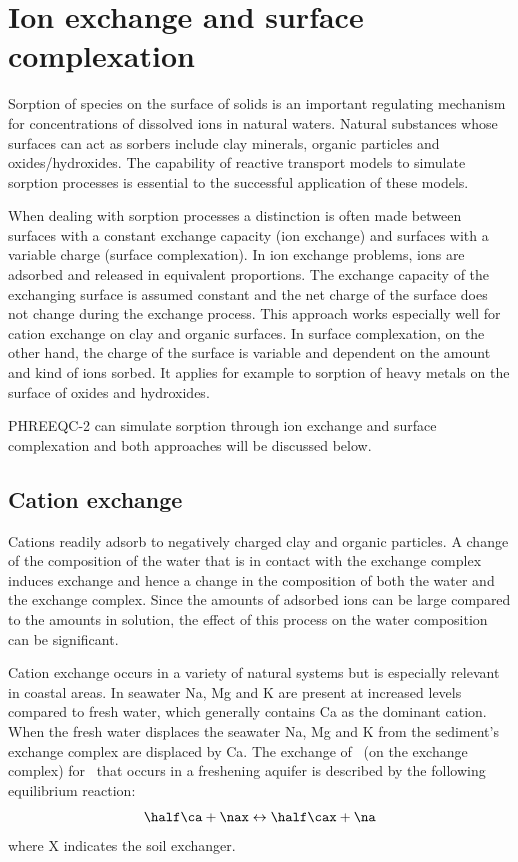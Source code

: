 \chapter{Ion exchange and surface complexation}
\def\shorttitle{Ion exchange and surface complexation} %

Sorption of species on the surface of solids is an important regulating mechanism for concentrations of dissolved ions in natural waters. Natural substances whose surfaces can act as sorbers include clay minerals, organic particles and oxides/hydroxides. The capability of reactive transport models to simulate sorption processes is essential to the successful application of these models.

When dealing with sorption processes a distinction is often made between surfaces with a constant exchange capacity (ion exchange) and surfaces with a variable charge (surface complexation). In ion exchange problems, ions are adsorbed and released in equivalent proportions. The exchange capacity of the exchanging surface is assumed constant and the net charge of the surface does not change during the exchange process. This approach works especially well for cation exchange on clay and organic surfaces. In surface complexation, on the other hand, the charge of the surface is variable and dependent on the amount and kind of ions sorbed. It applies for example to sorption of heavy metals on the surface of oxides and hydroxides. 

PHREEQC-2 can simulate sorption through ion exchange and surface complexation and both approaches will be discussed below.

\section{Cation exchange}
Cations readily adsorb to negatively charged clay and organic particles. A change of the composition of the water that is in contact with the exchange complex induces exchange and hence a change in the composition of both the water and the exchange complex. Since the amounts of adsorbed ions can be large compared to the amounts in solution, the effect of this process on the water composition can be significant.

Cation exchange occurs in a variety of natural systems but is especially relevant in coastal areas. In seawater Na, Mg and K are present at increased levels compared to fresh water, which generally contains Ca as the dominant cation. When the fresh water displaces the seawater Na, Mg and K from the sediment's exchange complex are displaced by Ca. The exchange of \na\ (on the exchange complex) for \ca\ that occurs in a freshening aquifer is described by the following equilibrium reaction:
\begin{equation}
\half \ca + \nax \leftrightarrow \half \cax + \na
\end{equation}
where X indicates the soil exchanger.

